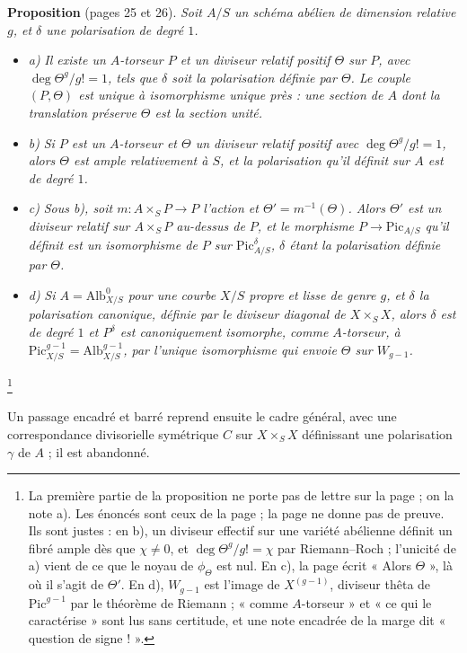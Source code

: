 \documentclass[11pt,a4paper]{article}
\begin{document}
\textbf{Proposition} (pages 25 et 26). \emph{Soit $A/S$ un schéma abélien de
dimension relative $g$, et $\delta$ une polarisation de degré $1$.}
\begin{itemize}
\item \emph{a)} \emph{Il existe un $A$-torseur $P$ et un diviseur relatif positif
  $\Theta$ sur $P$, avec $\deg \Theta^{g}/g! = 1$, tels que $\delta$ soit la
  polarisation définie par $\Theta$. Le couple $(P, \Theta)$ est unique à
  isomorphisme unique près : une section de $A$ dont la translation préserve
  $\Theta$ est la section unité.}
\item \emph{b)} \emph{Si $P$ est un $A$-torseur et $\Theta$ un diviseur relatif
  positif avec $\deg \Theta^{g}/g! = 1$, alors $\Theta$ est ample relativement
  à $S$, et la polarisation qu'il définit sur $A$ est de degré $1$.}
\item \emph{c)} \emph{Sous b), soit $m : A \times_S P \to P$ l'action et
  $\Theta' = m^{-1}(\Theta)$. Alors $\Theta'$ est un diviseur relatif sur
  $A \times_S P$ au-dessus de $P$, et le morphisme $P \to \mathrm{Pic}_{A/S}$
  qu'il définit est un isomorphisme de $P$ sur $\mathrm{Pic}^{\delta}_{A/S}$,
  $\delta$ étant la polarisation définie par $\Theta$.}
\item \emph{d)} \emph{Si $A = \mathrm{Alb}^{0}_{X/S}$ pour une courbe $X/S$ propre et
  lisse de genre $g$, et $\delta$ la polarisation canonique, définie par le
  diviseur diagonal de $X \times_S X$, alors $\delta$ est de degré $1$ et
  $P^{\delta}$ est canoniquement isomorphe, comme $A$-torseur, à
  $\mathrm{Pic}^{g-1}_{X/S} = \mathrm{Alb}^{g-1}_{X/S}$, par l'unique
  isomorphisme qui envoie $\Theta$ sur $W_{g-1}$.}
\end{itemize}
\footnote{La première partie de la proposition ne porte pas de lettre sur la
page ; on la note a). Les énoncés sont ceux de la page ; la page ne donne pas
de preuve. Ils sont justes : en b), un diviseur effectif sur une variété
abélienne définit un fibré ample dès que $\chi \neq 0$, et
$\deg\Theta^{g}/g! = \chi$ par Riemann--Roch ; l'unicité de a) vient de ce que
le noyau de $\phi_{\Theta}$ est nul. En c), la page écrit « Alors $\Theta$ »,
là où il s'agit de $\Theta'$. En d), $W_{g-1}$ est l'image de
$X^{(g-1)}$, diviseur thêta de $\mathrm{Pic}^{g-1}$ par le théorème de Riemann ;
« comme $A$-torseur » et « ce qui le caractérise » sont lus sans certitude, et
une note encadrée de la marge dit « question de signe ! ».}

Un passage encadré et barré reprend ensuite le cadre général, avec une
correspondance divisorielle symétrique $C$ sur $X \times_S X$ définissant une
polarisation $\gamma$ de $A$ ; il est abandonné.
\end{document}
